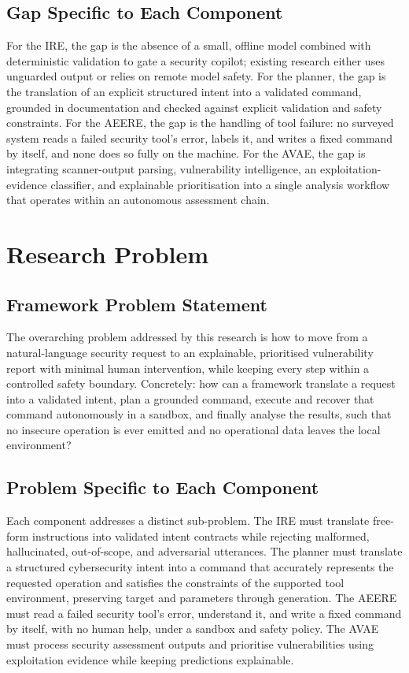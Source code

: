 \subsection{Gap Specific to Each Component}\label{sec:gap-percomponent}

For the IRE, the gap is the absence of a small, offline model combined with
deterministic validation to gate a security copilot; existing research either
uses unguarded output or relies on remote model safety. For the planner, the gap
is the translation of an explicit structured intent into a validated command,
grounded in documentation and checked against explicit validation and safety
constraints. For the AEERE, the gap is the handling of tool failure: no surveyed
system reads a failed security tool's error, labels it, and writes a fixed
command by itself, and none does so fully on the machine. For the AVAE, the gap
is integrating scanner-output parsing, vulnerability intelligence, an
exploitation-evidence classifier, and explainable prioritisation into a single
analysis workflow that operates within an autonomous assessment chain.

\section{Research Problem}\label{sec:problem}

\subsection{Framework Problem Statement}\label{sec:problem-overall}

The overarching problem addressed by this research is how to move from a
natural-language security request to an explainable, prioritised vulnerability
report with minimal human intervention, while keeping every step within a
controlled safety boundary. Concretely: how can a framework translate a request
into a validated intent, plan a grounded command, execute and recover that
command autonomously in a sandbox, and finally analyse the results, such that no
insecure operation is ever emitted and no operational data leaves the local
environment?

\subsection{Problem Specific to Each Component}\label{sec:problem-percomponent}

Each component addresses a distinct sub-problem. The IRE must translate
free-form instructions into validated intent contracts while rejecting
malformed, hallucinated, out-of-scope, and adversarial utterances. The planner
must translate a structured cybersecurity intent into a command that accurately
represents the requested operation and satisfies the constraints of the
supported tool environment, preserving target and parameters through
generation. The AEERE must read a failed security tool's error, understand it,
and write a fixed command by itself, with no human help, under a sandbox and
safety policy. The AVAE must process security assessment outputs and prioritise
vulnerabilities using exploitation evidence while keeping predictions
explainable.


